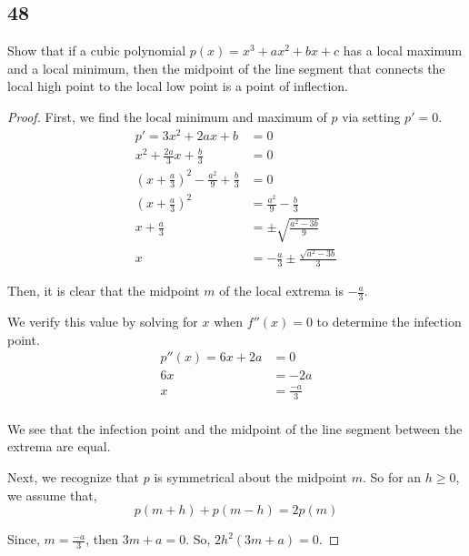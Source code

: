 \documentclass[../hw4.tex]{subfiles}
\begin{document}
\subsection*{48}
Show that if a cubic polynomial $p(x)=x^3+ax^2+bx+c$ has a local maximum and a local minimum, then the midpoint of the line segment that connects the local high point to the local low point is a point of inflection.

\begin{proof}
    First, we find the local minimum and maximum of $p$ via setting $p'=0$.
    \begin{align*}
        p' = 3x^2 + 2ax + b &= 0 \\
        x^2 + \frac{2a}{3}x + \frac{b}{3} &= 0 \\
        {\left( x + \frac{a}{3} \right)}^2 - \frac{a^2}{9} + \frac{b}{3} &= 0 \\
        {\left( x + \frac{a}{3} \right)}^2 &= \frac{a^2}{9} - \frac{b}{3} \\
        x+\frac{a}{3} &= \pm \sqrt{\frac{a^2-3b}{9}} \\
        x &= -\frac{a}{3} \pm \frac{\sqrt{a^2-3b}}{3}
    \end{align*}

    Then, it is clear that the midpoint $m$ of the local extrema is $-\frac{a}{3}$.

    We verify this value by solving for $x$ when $f''(x)=0$ to determine the infection point.
    \begin{align*}
        p''(x) = 6x+2a &= 0 \\
        6x &= -2a \\
        x &= \frac{-a}{3} \\
    \end{align*}

    We see that the infection point and the midpoint of the line segment between the extrema are equal.

    Next, we recognize that $p$ is symmetrical about the midpoint $m$. So for an $h\geq0$, we assume that, 
    \[p(m+h)+p(m-h) = 2p(m)\]

    Since, $m=\frac{-a}{3}$, then $3m+a=0$. So, $2h^2(3m+a)=0$.


\end{proof}
\end{document}
